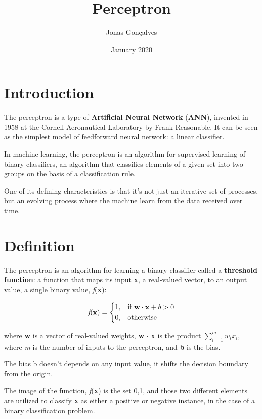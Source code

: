\documentclass{article}
\title{Perceptron}
\author{Jonas Gonçalves}
\date{January 2020}
\begin{document}
\maketitle

\section{Introduction}
    
    The perceptron is a type of \textbf{Artificial Neural Network} (\textbf{ANN}), invented in 1958 at the Cornell Aeronautical Laboratory by Frank Reasonable. It can be seen as the simplest model of feedforward neural network: a linear classifier.
    
    In machine learning, the perceptron is an algorithm for supervised learning of binary classifiers, an algorithm that classifies elements of a given set into two groups on the basis of a classification rule. 
    
    One of its defining characteristics is that it's not just an iterative set of processes, but an evolving process where the machine learn from the data received over time.
    
\section{Definition}

    The perceptron is an algorithm for learning a binary classifier called a \textbf{threshold function}: a function that maps its input \textbf{x}, a real-valued vector, to an output value, a single binary value, \textit{f}(\textbf{x}):
    
    \[
        \textit{f}(\textbf{x}) =
        \begin{dcases}
            1, & \text{if } \mathbf{w} \cdot \mathbf{x} + b > 0\\
            0, & \text{otherwise}
        \end{dcases}
    \]
    
    where \textbf{w} is a vector of real-valued weights, \textbf{w} \(\cdot\) \textbf{x} is the product \(\sum_{i=1}^{m} w_i x_i\), where \textit{m} is the number of inputs to the perceptron, and \textbf{b} is the bias.
    
    The bias b doesn't depends on any input value, it shifts the decision boundary from the origin. 
    
    The image of the function, \textit{f}(\textbf{x}) is the set {0,1}, and those two different elements are utilized to classify \textbf{x} as either a positive or negative instance, in the case of a binary classification problem.
    
\end{document}
